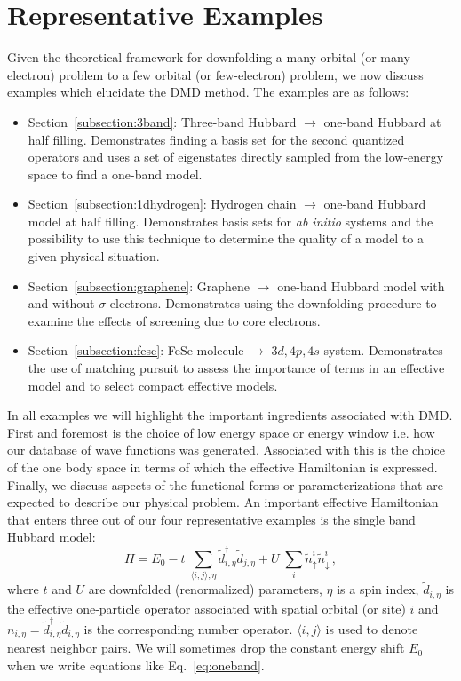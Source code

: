 \section{Representative Examples}
Given the theoretical framework for downfolding a many orbital (or many-electron) problem to a 
few orbital (or few-electron) problem, we now discuss examples which elucidate the DMD method. 
The examples are as follows:
\begin{itemize}
\item Section~\ref{subsection:3band}: Three-band Hubbard $\rightarrow$ one-band Hubbard at half filling. Demonstrates finding a basis set for the second quantized operators and uses a set of eigenstates directly sampled from the low-energy space to find a one-band model.
\item Section~\ref{subsection:1dhydrogen}: Hydrogen chain $\rightarrow$ one-band Hubbard model at half filling. Demonstrates basis sets for {\it ab initio} systems and the possibility to use this technique to determine the quality of a model to a given physical situation.
\item Section~\ref{subsection:graphene}: Graphene $\rightarrow$ one-band Hubbard model with and without $\sigma$ electrons. Demonstrates using the downfolding procedure to examine the effects of screening due to core electrons. 
\item Section~\ref{subsection:fese}: FeSe molecule $\rightarrow$ $3d,4p,4s$ system. Demonstrates the use of matching pursuit to assess the importance of terms in an effective model and to select compact effective models.
\end{itemize}

In all examples we will highlight the important ingredients associated with DMD. 
First and foremost is the choice of low energy space or energy window i.e. how our database of wave functions was generated. 
Associated with this is the choice of the one body space in terms of which the effective Hamiltonian is expressed. 
Finally, we discuss aspects of the functional forms or parameterizations that are expected to describe our physical problem. 
An important effective Hamiltonian that enters three out of our four representative examples is the single band Hubbard model:
\begin{equation}
	H = E_0 -t \;\sum_{\langle i,j \rangle, \eta} \tilde{d}_{i,\eta}^{\dagger} \tilde{d}_{j,\eta} + U \;\sum_{i} \tilde{n}^{i}_{\uparrow} \tilde{n}^{i}_{\downarrow}\,,
\label{eq:oneband}
\end{equation}
where $t$ and $U$ are downfolded (renormalized) parameters, $\eta$ is a spin index, 
$\tilde{d}_{i,\eta}$ is the effective one-particle operator associated with spatial orbital (or site) $i$ 
and $n_{i,\eta}=\tilde{d}_{i,\eta}^{\dagger} \tilde{d}_{i,\eta}$ is the corresponding number operator.
$\langle i,j \rangle$ is used to denote nearest neighbor pairs.
We will sometimes drop the constant energy shift $E_0$ when we write equations like Eq.~\eqref{eq:oneband}.

